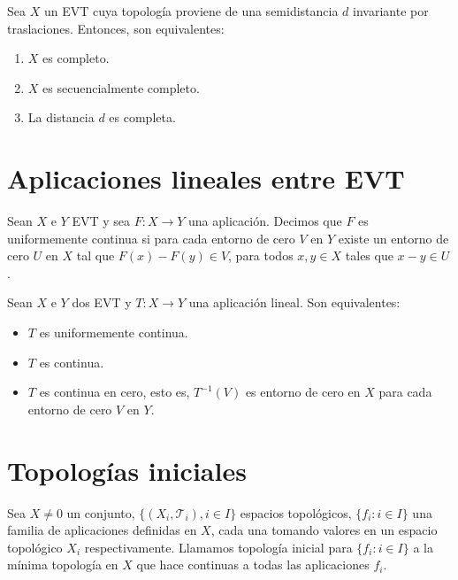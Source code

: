 \begin{proposicion}
Sea $X$ un EVT cuya topología proviene de una semidistancia $d$ invariante por traslaciones. Entonces, son equivalentes: 
\begin{enumerate}
	\item $X$ es completo.
	\item $X$ es secuencialmente completo.
	\item La distancia $d$ es completa.
\end{enumerate}

\end{proposicion}

\section{Aplicaciones lineales entre EVT}
\begin{definicion}
Sean $X$ e $Y$ EVT y sea $F:X\rightarrow Y$ una aplicación. Decimos que $F$ es uniformemente continua si para cada entorno de cero $V$ en $Y$ existe un entorno de cero $U$ en $X$ tal que $F(x) - F(y) \in V$, para todos $x,y\in X$ tales que $x-y\in U$. 
\end{definicion}

\begin{proposicion}
Sean $X$ e $Y$ dos EVT y $T:X\rightarrow Y$ una aplicación lineal. Son equivalentes:
\begin{itemize}
	\item $T$ es uniformemente continua.
	\item $T$ es continua.
	\item $T$ es continua en cero, esto es, $T^{-1}(V)$ es entorno de cero en $X$ para cada entorno de cero $V$ en $Y$. 
\end{itemize}
\end{proposicion}

\section{Topologías iniciales}
\begin{definicion}
Sea $X\neq 0$ un conjunto, $\{(X_{i},\mathcal{T}_{i}), i\in I\}$ espacios topológicos, $\{f_{i} : i\in I \}$ una familia de aplicaciones definidas en $X$, cada una tomando valores en un espacio topológico $X_{i}$ respectivamente. Llamamos topología inicial para $\{ f_{i} : i\in I\}$ a la mínima topología en $X$ que hace continuas a todas las aplicaciones $f_{i}$. 
\end{definicion}

